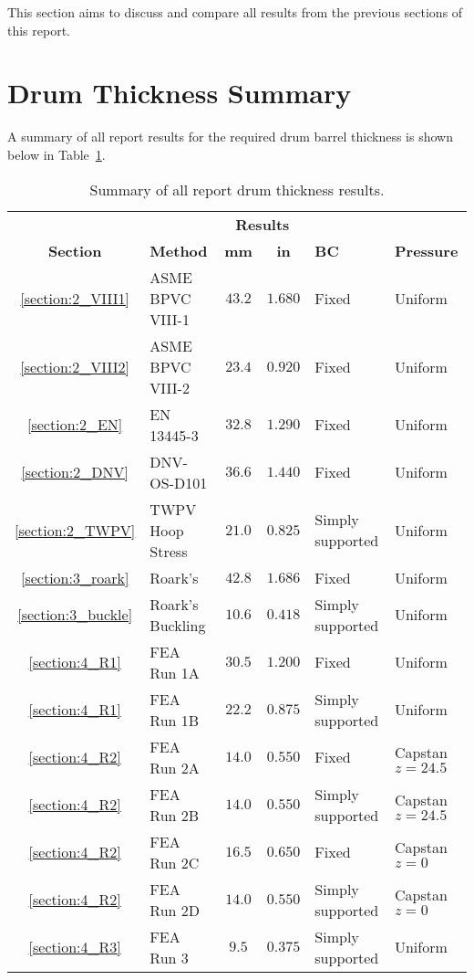 
This section aims to discuss and compare all results from the previous sections of this report.

\section{Drum Thickness Summary}

A summary of all report results for the required drum barrel thickness is shown below in Table~\ref{table:5_sum}.

\begin{table}[H]
  \centering
  \caption{Summary of all report drum thickness results.}
    \begin{tabular}{clccll}
          &       & \multicolumn{2}{c}{\textbf{Results}} &       &  \\
    \textbf{Section} & \textbf{Method} & \textbf{mm} & \textbf{in} & \textbf{BC} & \textbf{Pressure } \\
    \midrule
          \ref{section:2_VIII1}& ASME BPVC VIII-1 & $43.2$ & $1.680$ & Fixed & Uniform \\
          \ref{section:2_VIII2}& ASME BPVC VIII-2 & $23.4$ & $0.920$ & Fixed & Uniform \\
          \ref{section:2_EN}& EN 13445-3 & $32.8$ & $1.290$ & Fixed & Uniform \\
          \ref{section:2_DNV}& DNV-OS-D101 & $36.6$ & $1.440$ & Fixed & Uniform \\
          \ref{section:2_TWPV}& TWPV Hoop Stress & $21.0$ & $0.825$ & Simply supported & Uniform \\
          \ref{section:3_roark}& Roark's & $42.8$ & $1.686$ & Fixed & Uniform \\
          \ref{section:3_buckle}& Roark's Buckling & $10.6$ & $0.418$ & Simply supported & Uniform \\
          \ref{section:4_R1}& FEA Run 1A & $30.5$ & $1.200$ & Fixed & Uniform \\
          \ref{section:4_R1}& FEA Run 1B & $22.2$ & $0.875$ & Simply supported & Uniform \\
          \ref{section:4_R2}& FEA Run 2A & $14.0$ & $0.550$ & Fixed & Capstan $z=24.5$ \\
          \ref{section:4_R2}& FEA Run 2B & $14.0$ & $0.550$ & Simply supported & Capstan $z=24.5$\\
          \ref{section:4_R2}& FEA Run 2C & $16.5$ & $0.650$ & Fixed & Capstan $z=0$ \\
          \ref{section:4_R2}& FEA Run 2D & $14.0$ & $0.550$ & Simply supported & Capstan $z=0$  \\
          \ref{section:4_R3}& FEA Run 3 & $9.5$ & $0.375$ & Simply supported & Uniform \\
    \end{tabular}
  \label{table:5_sum}
\end{table}%

